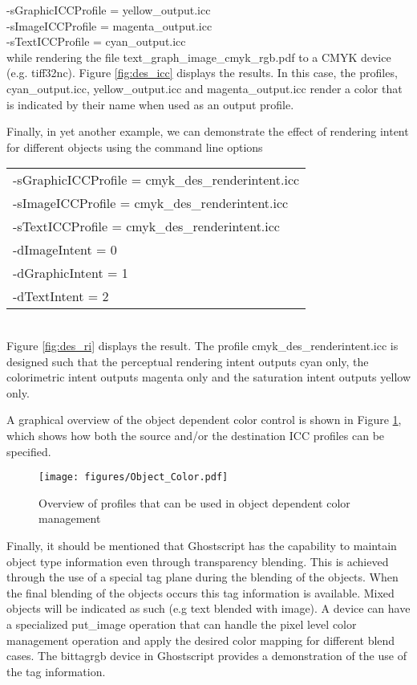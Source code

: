 \documentclass[12pt,notitlepage]{article}
\begin{document}
\noindent -sGraphicICCProfile = yellow\_output.icc\\
-sImageICCProfile = magenta\_output.icc\\
-sTextICCProfile = cyan\_output.icc\\

\noindent while rendering the file text\_graph\_image\_cmyk\_rgb.pdf to a CMYK device (e.g. tiff32nc).  Figure \ref{fig:des_icc} displays the results.  In this case, the profiles,
cyan\_output.icc, yellow\_output.icc and magenta\_output.icc render a color that is indicated by their name when used as an output profile.

Finally, in yet another example, we can demonstrate the effect of rendering intent for different objects using the command line options\\

\begin{tabular}{l}
-sGraphicICCProfile = cmyk\_des\_renderintent.icc\\
-sImageICCProfile = cmyk\_des\_renderintent.icc\\
 -sTextICCProfile = cmyk\_des\_renderintent.icc\\
-dImageIntent = 0\\
-dGraphicIntent = 1\\
-dTextIntent = 2\\
\end{tabular}\\

Figure \ref{fig:des_ri} displays the result.  The profile cmyk\_des\_renderintent.icc is designed such that the perceptual rendering intent outputs cyan only, the colorimetric intent outputs magenta only and the saturation intent outputs yellow only.

A graphical overview of the object dependent color control is shown in Figure \ref{fig:object_dep_color}, which shows how both the source and/or the destination ICC profiles can be specified.\\


\begin{figure}
    \begin{center}
\texttt{[image: figures/Object\_Color.pdf]}
    \end{center}
   \caption{Overview of profiles that can be used in object dependent color
            management}
\label{fig:object_dep_color}
\end{figure}


Finally, it should be mentioned that Ghostscript has the capability to maintain object type information even through transparency blending.  This is achieved through the use of a special tag plane during the blending of the objects.  When the final blending of the objects occurs this tag information is available.  Mixed objects will be indicated as such (e.g text blended with image).  A device can have a specialized put\_image operation that can handle the pixel level color management operation and apply the desired color mapping for different blend cases.  The bittagrgb device in Ghostscript provides a demonstration of the use of the tag information.
\end{document}
